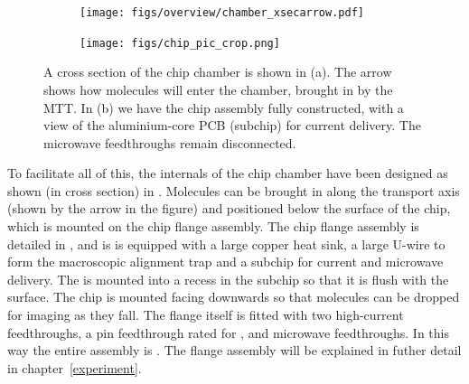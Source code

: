 \begin{figure}
  \centering
  \begin{subfigure}[b]{0.45\textwidth}
    \texttt{[image: figs/overview/chamber\_xsecarrow.pdf]}
    \caption{}
  \end{subfigure}
  \hspace{1cm}
  \begin{subfigure}[b]{0.45\textwidth}
    \texttt{[image: figs/chip\_pic\_crop.png]}
    \caption{}
  \end{subfigure}
  \caption{
  A cross section of the chip chamber is shown in (a). The arrow shows how
  molecules will enter the chamber, brought in by the MTT.
  In (b) we have the chip assembly fully constructed, with a view of the
    aluminium-core PCB (subchip) for current delivery. The
    microwave feedthroughs remain disconnected.
  }
  \label{overview:fig:chipchamber}
\end{figure}


To facilitate all of this, the internals of the chip chamber have been designed
as shown (in cross section) in .
Molecules can be brought in along the transport axis (shown by the arrow in the
figure) and positioned below the surface of the chip, which is mounted on the
chip flange assembly. The chip flange assembly is detailed in
, and is is equipped with a large
copper heat sink, a large U-wire to form the macroscopic alignment trap and a
subchip for current and microwave delivery. The  is mounted
into a recess in the subchip so that it is flush with the surface. The chip is
mounted facing downwards so that molecules can be dropped for imaging as they
fall. The flange itself is fitted with two high-current feedthroughs, a 
pin feedthrough rated for , and microwave feedthroughs. In this
way the entire assembly is . The flange assembly
will be explained in futher detail in chapter~\ref{experiment}.
